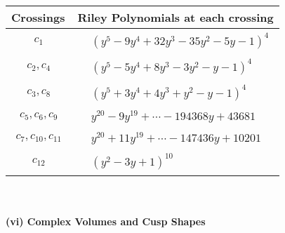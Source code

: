 \documentclass[1p]{elsarticle_modified}
\theoremstyle{definition}
\begin{document}
\begin{tabular}{m{50pt}|m{274pt}}
Crossings & \hspace{64pt}Riley Polynomials at each crossing \\
\hline $$\begin{aligned}c_{1}\end{aligned}$$&$\begin{aligned}
&(y^5-9 y^4+32 y^3-35 y^2-5 y-1)^4
\end{aligned}$\\
\hline $$\begin{aligned}c_{2},c_{4}\end{aligned}$$&$\begin{aligned}
&(y^5-5 y^4+8 y^3-3 y^2- y-1)^4
\end{aligned}$\\
\hline $$\begin{aligned}c_{3},c_{8}\end{aligned}$$&$\begin{aligned}
&(y^5+3 y^4+4 y^3+y^2- y-1)^4
\end{aligned}$\\
\hline $$\begin{aligned}c_{5},c_{6},c_{9}\end{aligned}$$&$\begin{aligned}
&y^{20}-9 y^{19}+\cdots-194368 y+43681
\end{aligned}$\\
\hline $$\begin{aligned}c_{7},c_{10},c_{11}\end{aligned}$$&$\begin{aligned}
&y^{20}+11 y^{19}+\cdots-147436 y+10201
\end{aligned}$\\
\hline $$\begin{aligned}c_{12}\end{aligned}$$&$\begin{aligned}
&(y^2-3 y+1)^{10}
\end{aligned}$\\
\hline
\end{tabular}\\~\\
\newpage\flushleft \textbf{(vi) Complex Volumes and Cusp Shapes}
\end{document}
